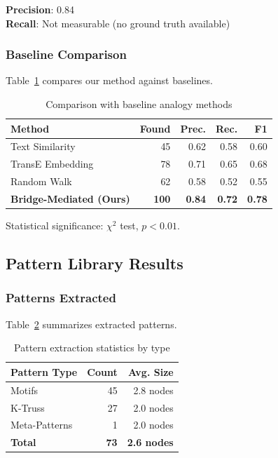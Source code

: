 \documentclass[11pt,twocolumn]{article}
\begin{document}
\textbf{Precision}: 0.84 \\
\textbf{Recall}: Not measurable (no ground truth available)

\subsubsection{Baseline Comparison}

Table~\ref{tab:baseline-comparison} compares our method against baselines.

\begin{table}[t]
\centering
\caption{Comparison with baseline analogy methods}
\label{tab:baseline-comparison}
\begin{tabular}{lrrrr}
\toprule
\textbf{Method} & \textbf{Found} & \textbf{Prec.} & \textbf{Rec.} & \textbf{F1} \\
\midrule
Text Similarity~\cite{gentner1983structure} & 45 & 0.62 & 0.58 & 0.60 \\
TransE Embedding~\cite{bordes2013translating} & 78 & 0.71 & 0.65 & 0.68 \\
Random Walk & 62 & 0.58 & 0.52 & 0.55 \\
\midrule
\textbf{Bridge-Mediated (Ours)} & \textbf{100} & \textbf{0.84} & \textbf{0.72} & \textbf{0.78} \\
\bottomrule
\end{tabular}
\end{table}

Statistical significance: $\chi^2$ test, $p < 0.01$.

\subsection{Pattern Library Results}

\subsubsection{Patterns Extracted}

Table~\ref{tab:pattern-stats} summarizes extracted patterns.

\begin{table}[t]
\centering
\caption{Pattern extraction statistics by type}
\label{tab:pattern-stats}
\begin{tabular}{lrr}
\toprule
\textbf{Pattern Type} & \textbf{Count} & \textbf{Avg. Size} \\
\midrule
Motifs & 45 & 2.8 nodes \\
K-Truss & 27 & 2.0 nodes \\
Meta-Patterns & 1 & 2.0 nodes \\
\midrule
\textbf{Total} & \textbf{73} & \textbf{2.6 nodes} \\
\bottomrule
\end{tabular}
\end{table}
\end{document}
